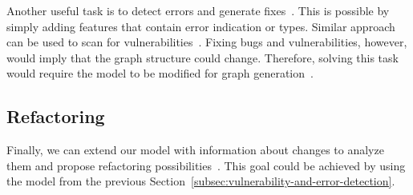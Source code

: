 Another useful task is to detect errors and generate fixes~\cite{bhatia_automated_2016,marginean_sapfix_2019}.
This is possible by simply adding features that contain error indication or types.
Similar approach can be used to scan for vulnerabilities~\cite{li_vuldeepecker_2018,russell_automated_2018,nguyen_regvd_2021}.
Fixing bugs and vulnerabilities, however, would imply that the graph structure could change.
Therefore, solving this task would require the model to be modified for graph generation~\cite{khajenezhad2022gransformer}.

\subsection{Refactoring}\label{subsec:refactoring}

Finally, we can extend our model with information about changes to analyze them and propose refactoring possibilities~\cite{cabrera_lozoya_commit2vec_2021}.
This goal could be achieved by using the model from the previous Section~\ref{subsec:vulnerability-and-error-detection}.